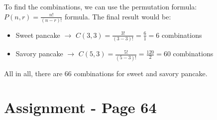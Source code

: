 \documentclass[12pt,titlepage]{article}
\begin{document}
\begin{enumerate}
{        To find the combinations, we can use the permutation formula: $P(n,r)=\frac{n!}{(n-r)!}$ formula.
        The final result would be:
        \begin{itemize}
            \item Sweet pancake $\rightarrow$ $C(3, 3)=\frac{3!}{(3-3)!}=\frac{6}{1}=6$ combinations
            \item Savory pancake $\rightarrow$ $C(5, 3)=\frac{5!}{(5-3)!}=\frac{120}{2}=60$ combinations
        \end{itemize}

        All in all, there are 66 combinations for sweet and savory pancake.
    }
\end{enumerate}

\section{Assignment - Page 64}
\end{document}
